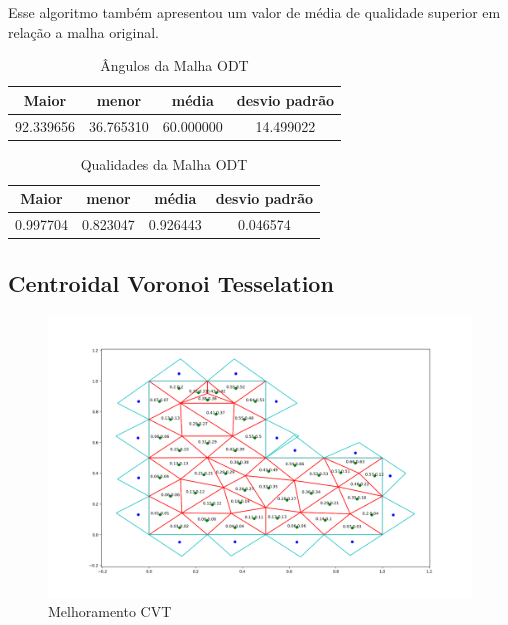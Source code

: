 Esse algoritmo também apresentou um valor de média de qualidade superior em relação a malha original.

\begin{table}[hb]
\centering
\par\caption{Ângulos da Malha ODT}
\begin{tabular}{c|c|c|c}
Maior&menor&média&desvio padrão\\\hline\hline
92.339656&36.765310&60.000000&14.499022\\\hline
\end{tabular}
\label{tab:angulos-malha-odt}
\end{table}

\begin{table}[hb]
\centering
\par\caption{Qualidades da Malha ODT}
\begin{tabular}{c|c|c|c}
Maior&menor&média&desvio padrão\\\hline\hline
0.997704&0.823047&0.926443&0.046574\\\hline
\end{tabular}
\label{tab:qualidades-malha-odt}
\end{table}

\newpage
\subsection{Centroidal Voronoi Tesselation}

\begin{figure}[ht]
    \centering
    \includegraphics[width=1\linewidth]{fig/malha-cvt.png}
    \caption{Melhoramento CVT}
    \label{fig:malha-cvt}
\end{figure}

